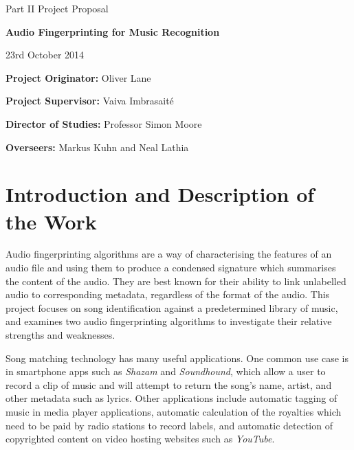 \documentclass[12pt]{article}
\begin{document}
\thispagestyle{empty}

\medskip
{}
\medskip
{}

\vfil

\centerline{\large Part II Project Proposal}
\vspace{0.4in}
\centerline{\Large\bf Audio Fingerprinting for Music Recognition}
\vspace{0.3in}
\centerline{\large 23rd October 2014}

\vfil

{\bf Project Originator:} Oliver Lane

\vspace{0.3in}

{\bf Project Supervisor:} Vaiva Imbrasait\'{e}

\vspace{0.3in}

{\bf Director of Studies:} Professor Simon Moore

\vspace{0.3in}

{\bf Overseers:} Markus Kuhn and Neal Lathia

\vfil
\eject

\cleardoublepage
\setcounter{page}{1}

\section*{Introduction and Description of the Work}

Audio fingerprinting algorithms are a way of characterising the features of an audio file and using them to produce a condensed signature which summarises the content of the audio. They are best known for their ability to link unlabelled audio to corresponding metadata, regardless of the format of the audio. This project focuses on song identification against a predetermined library of music, and examines two audio fingerprinting algorithms to investigate their relative strengths and weaknesses.

Song matching technology has many useful applications. One common use case is in smartphone apps such as \emph{Shazam} and \emph{Soundhound}, which allow a user to record a clip of music and will attempt to return the song's name, artist, and other metadata such as lyrics. Other applications include automatic tagging of music in media player applications, automatic calculation of the royalties which need to be paid by radio stations to record labels, and automatic detection of copyrighted content on video hosting websites such as \emph{YouTube}.
\end{document}
